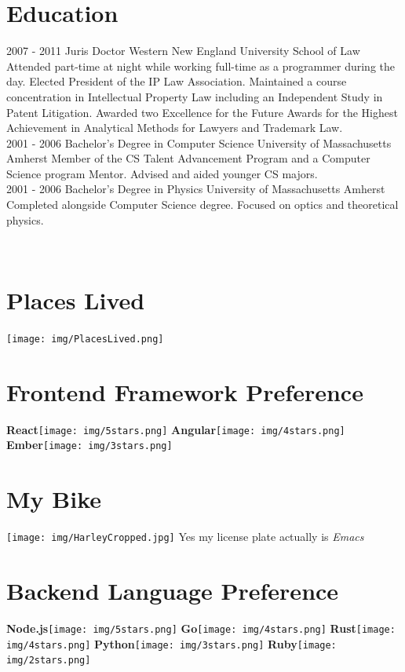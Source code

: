 \documentclass[]{friggeri-cv}
\begin{document}
\section{Education}
\begin{entrylist}
  \entry
    {2007 - 2011}
    {Juris Doctor}
    {Western New England University School of Law}
    {Attended part-time at night while working full-time as a programmer during the day. Elected President of the IP Law Association. Maintained a course concentration in Intellectual Property Law including an Independent Study in Patent Litigation. Awarded two Excellence for the Future Awards for the Highest Achievement in Analytical Methods for Lawyers and Trademark Law.\\}
  \entry
    {2001 - 2006}
    {Bachelor's Degree in Computer Science}
    {University of Massachusetts Amherst}
    {Member of the CS Talent Advancement Program and a Computer Science program Mentor. Advised and aided younger CS majors.\\}
  \entry
    {2001 - 2006}
    {Bachelor's Degree in Physics}
    {University of Massachusetts Amherst}
    {Completed alongside Computer Science degree. Focused on optics and theoretical physics.}
\end{entrylist}

\newpage

\begin{aside}
~
~
~
  \section{Places Lived}
    \texttt{[image: img/PlacesLived.png]}
    ~
  \section{Frontend Framework Preference}
    \textbf{React}\texttt{[image: img/5stars.png]}
    \textbf{Angular}\texttt{[image: img/4stars.png]}
    \textbf{Ember}\texttt{[image: img/3stars.png]}
    ~
  \section{My Bike}
    \texttt{[image: img/HarleyCropped.jpg]}
    {Yes my license plate actually is \textit{Emacs}}
    ~
   \section{Backend Language Preference}
    \textbf{Node.js}\texttt{[image: img/5stars.png]}
    \textbf{Go}\texttt{[image: img/4stars.png]}
    \textbf{Rust}\texttt{[image: img/4stars.png]}
    \textbf{Python}\texttt{[image: img/3stars.png]}
    \textbf{Ruby}\texttt{[image: img/2stars.png]}
    ~
\end{aside}
\end{document}
